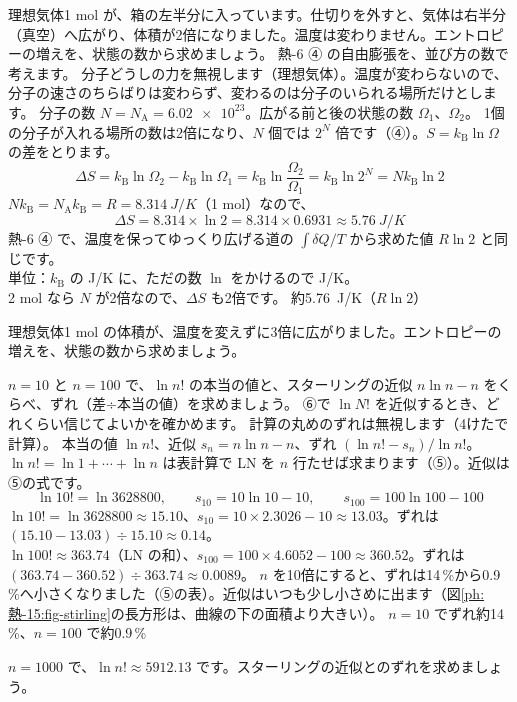 \label{ph:熱-15:ex4}
\begin{phreidai}[自由膨張のエントロピーを数えて求める]
理想気体1 mol が、箱の左半分に入っています。仕切りを外すと、気体は右半分（真空）へ広がり、体積が2倍になりました。温度は変わりません。エントロピーの増えを、状態の数から求めましょう。
\phbamen
熱-6 ④ の自由膨張を、並び方の数で考えます。
\phmushi
分子どうしの力を無視します（理想気体）。温度が変わらないので、分子の速さのちらばりは変わらず、変わるのは分子のいられる場所だけとします。
\phzu
分子の数 $N=N_{\mathrm A}=\num{6.02e23}$。広がる前と後の状態の数 $\Omega_1$、$\Omega_2$。
\phriyu
1個の分子が入れる場所の数は2倍になり、$N$ 個では $2^N$ 倍です（④）。$S=k_{\mathrm B}\ln\Omega$ の差をとります。
\phtateru
\[\Delta S=k_{\mathrm B}\ln\Omega_2-k_{\mathrm B}\ln\Omega_1=k_{\mathrm B}\ln\frac{\Omega_2}{\Omega_1}=k_{\mathrm B}\ln2^{N}=Nk_{\mathrm B}\ln2\]
\phtoku
$Nk_{\mathrm B}=N_{\mathrm A}k_{\mathrm B}=R=\qty{8.314}{J/K}$（1 mol）なので、
\[\Delta S=8.314\times\ln2=8.314\times0.6931\approx\qty{5.76}{J/K}\]
\phtashikame
熱-6 ④ で、温度を保ってゆっくり広げる道の $\int\delta Q/T$ から求めた値 $R\ln2$ と同じです。\\
単位：$k_{\mathrm B}$ の J/K に、ただの数 $\ln$ をかけるので J/K。\\
2 mol なら $N$ が2倍なので、$\Delta S$ も2倍です。
\kotae 約\qty{5.76}{J/K}（$R\ln2$）
\end{phreidai}
\begin{jibun}
理想気体1 mol の体積が、温度を変えずに3倍に広がりました。エントロピーの増えを、状態の数から求めましょう。
\end{jibun}

\label{ph:熱-15:ex5}
\begin{phreidai}
$n=10$ と $n=100$ で、$\ln n!$ の本当の値と、スターリングの近似 $n\ln n-n$ をくらべ、ずれ（差÷本当の値）を求めましょう。
\phbamen
⑥で $\ln N!$ を近似するとき、どれくらい信じてよいかを確かめます。
\phmushi
計算の丸めのずれは無視します（4けたで計算）。
\phzu
本当の値 $\ln n!$、近似 $s_n=n\ln n-n$、ずれ $(\ln n!-s_n)/\ln n!$。
\phriyu
$\ln n!=\ln1+\cdots+\ln n$ は表計算で LN を $n$ 行たせば求まります（⑤）。近似は⑤の式です。
\phtateru
\[\ln10!=\ln\num{3628800},\qquad s_{10}=10\ln10-10,\qquad s_{100}=100\ln100-100\]
\phtoku
$\ln10!=\ln\num{3628800}\approx15.10$、$s_{10}=10\times2.3026-10\approx13.03$。ずれは $(15.10-13.03)\div15.10\approx0.14$。\\
$\ln100!\approx363.74$（LN の和）、$s_{100}=100\times4.6052-100\approx360.52$。ずれは $(363.74-360.52)\div363.74\approx0.0089$。
\phtashikame
$n$ を10倍にすると、ずれは14\,\%から0.9\,\%へ小さくなりました（⑤の表）。近似はいつも少し小さめに出ます（図\ref{ph:熱-15:fig-stirling}の長方形は、曲線の下の面積より大きい）。
\kotae $n=10$ でずれ約14\,\%、$n=100$ で約0.9\,\%
\end{phreidai}
\begin{jibun}
$n=\num{1000}$ で、$\ln n!\approx\num{5912.13}$ です。スターリングの近似とのずれを求めましょう。
\end{jibun}

